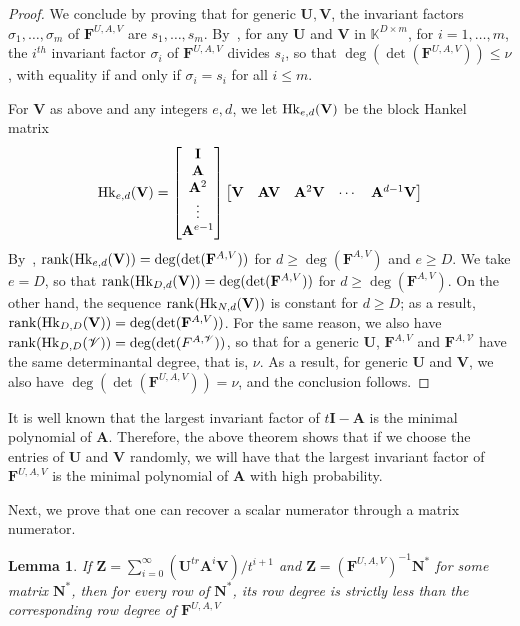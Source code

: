\documentclass[12pt]{article}
\newtheorem{Lemma}{Lemma}
\def\K {\ensuremath{\mathbb{K}}}
\def\scrV {\ensuremath{\mathscr{V}}}
\def\K{\mathbb{K}}
\def\mA{\mathbf{A}}
\def\mF{\mathbf{F}}
\def\mI{\mathbf{I}}
\def\mN{\mathbf{N}}
\def\mU{\mathbf{U}}
\def\mV{\mathbf{V}}
\def\mZ{\mathbf{Z}}
\begin{document}
\begin{proof}
	We conclude by proving that for generic $\mU,\mV$, the invariant factors
	$\sigma_1,\dots,\sigma_m$ of $\mF^{U,A,V}$ are $s_1,\dots,s_m$.
	By~\cite[Theorem~2.12]{KaVi04}, for any $\mU$ and $\mV$ in $\K^{D\times
		m}$, for $i=1,\dots,m$, the $i^{th}$ invariant factor $\sigma_i$ of
	$\mF^{U,A,V}$ divides $s_i$, so that $\deg(\det(\mF^{U,A,V}))\le\nu$, with
	equality if and only if $\sigma_i=s_i$ for all $i \le m$.
	
	For $\mV$ as above and any integers $e,d$, we let ${\rm Hk}_{e,d}(\mV)$ be
	the block Hankel matrix
	$$ {\rm Hk}_{e,d}(\mV) =
	\begin{bmatrix}
	\mI \\  \mA \\  \mA^2 \\ \vdots  \\  \mA^{e-1}
	\end{bmatrix}
	\begin{bmatrix}
	\mV & \mA\mV & \mA^2\mV &\cdots&  \mA^{d-1}\mV
	\end{bmatrix}
	$$ By~\cite[Eq.~(2.6)]{KaVi04}, ${\rm rank}({\rm Hk}_{e,d}(\mV)) =
	\deg(\det(\mF^{A,V}))$ for $d \ge \deg(\mF^{A,V})$ and $e \ge D$.  We take
	$e=D$, so that ${\rm rank}({\rm Hk}_{D,d}(\mV)) = \deg(\det(\mF^{A,V}))$
	for $d \ge \deg(\mF^{A,V})$. On the other hand, the sequence ${\rm
		rank}({\rm Hk}_{N,d}(\mV))$ is constant for $d \ge D$; as a result,
	${\rm rank}({\rm Hk}_{D,D}(\mV)) = \deg(\det(\mF^{A,V}))$. For the same
	reason, we also have ${\rm rank}({\rm Hk}_{D,D}(\scrV)) =
	\deg(\det(F^{A,\scrV}))$, so that for a generic $\mU$, $\mF^{A,V}$ and
	$\mF^{A,\scrV}$ have the same determinantal degree, that is, $\nu$.  As
	a result, for generic $\mU$ and $\mV$, we also have
	$\deg(\det(\mF^{U,A,V}))=\nu$, and the conclusion follows.
\end{proof} 

It is well known that the largest invariant factor of
$t\mI - \mA$ is the minimal polynomial of $\mA$. Therefore, the above
theorem shows that if we choose the entries of $\mU$ and $\mV$
randomly, we will have that the
largest invariant factor of $\mF^{U,A,V}$ is the minimal
polynomial of $\mA$  with high probability.

Next, we prove that one can recover a scalar numerator
through a matrix numerator.

\begin{Lemma}\label{num_deg}
	If $\mZ = 
	\sum_{i=0}^{\infty} (\mU^{tr} \mA^i \mV)/ t^{i+1}$ and
	$\mZ = (\mF^{U,A,V})^{-1}\mN^*$ for some matrix $\mN^*$,
	then for every row of $\mN^*$, 
	its row degree is strictly
	less than the corresponding row degree of $\mF^{U,A,V}$
\end{Lemma}
\end{document}
